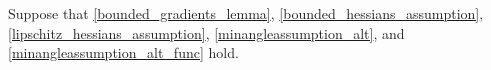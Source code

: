 Suppose that \cref{bounded_gradients_lemma}, \cref{bounded_hessians_assumption}, \cref{lipschitz_hessians_assumption}, \cref{minangleassumption_alt}, and \cref{minangleassumption_alt_func} hold.
